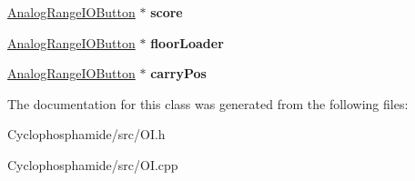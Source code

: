 \begin{DoxyCompactItemize}
\item 
\hypertarget{class_o_i_a1206fbdbd35750c76320654507eebc10}{}\hyperlink{class_analog_range_i_o_button}{Analog\+Range\+I\+O\+Button} $\ast$ {\bfseries score}\label{class_o_i_a1206fbdbd35750c76320654507eebc10}

\item 
\hypertarget{class_o_i_ae4d63b41ae99e641da76752601c57a23}{}\hyperlink{class_analog_range_i_o_button}{Analog\+Range\+I\+O\+Button} $\ast$ {\bfseries floor\+Loader}\label{class_o_i_ae4d63b41ae99e641da76752601c57a23}

\item 
\hypertarget{class_o_i_a0edb23920c0a009331a49b95a6f7b2fd}{}\hyperlink{class_analog_range_i_o_button}{Analog\+Range\+I\+O\+Button} $\ast$ {\bfseries carry\+Pos}\label{class_o_i_a0edb23920c0a009331a49b95a6f7b2fd}

\end{DoxyCompactItemize}


The documentation for this class was generated from the following files\+:\begin{DoxyCompactItemize}
\item 
Cyclophosphamide/src/O\+I.\+h\item 
Cyclophosphamide/src/O\+I.\+cpp\end{DoxyCompactItemize}
